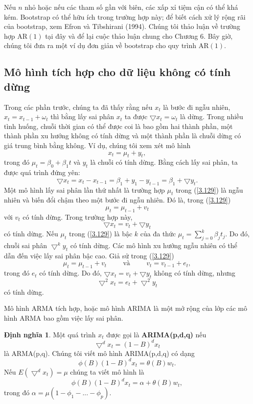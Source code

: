 \documentclass[12pt, a4paper,oneside]{book}
\theoremstyle{definition}
\newtheorem{dn}[theo]{Định nghĩa}
\begin{document}
Nếu $ n $ nhỏ hoặc nếu các tham số gần với biên, các xấp xỉ tiệm cận có thể khá kém. Bootstrap có thể hữu ích trong trường hợp này; để biết cách xử lý rộng rãi của bootstrap, xem Efron và Tibshirani (1994). Chúng tôi thảo luận về trường hợp AR$(1)$ tại đây và để lại cuộc thảo luận chung cho Chương 6. Bây giờ, chúng tôi đưa ra một ví dụ đơn giản về bootstrap cho quy trình AR$(1)$.
\subsection{Mô hình tích hợp cho dữ liệu không có tính dừng}
Trong các phần trước, chúng ta đã thấy rằng nếu $ x_{t} $ là bước đi ngẫu nhiên, $ x_{t}=x_{t-1}+\omega_{t} $ thì bằng lấy sai phân $ x_{t} $ ta được $ \bigtriangledown x_{t}=\omega_{t} $ là dừng. Trong nhiều tình huống, chuỗi thời gian có thể được coi là bao gồm hai thành phần, một thành phần xu hướng không có tính dừng và một thành phần là chuỗi dừng có giá trung bình bằng không. Ví dụ, chúng tôi xem xét mô hình
\begin{equation}
	x_t=\mu_t+y_t, \label{3.129}
\end{equation}
trong đó $\mu_t=\beta_0+\beta_1t$ và $y_t$ là chuỗi có tính dừng. Bằng cách lấy sai phân, ta được quá trình đứng yên:
$$\bigtriangledown x_t=x_t-x_{t-1}=\beta_1+y_1-y_{t-1}=\beta_1+\bigtriangledown y_t.$$
Một mô hình lấy sai phân lần thứ nhất là trường hợp $\mu_t$ trong (\ref{3.129}) là ngẫu nhiên và biến đổi chậm theo một bước đi ngẫu nhiên. Đó là, trong (\ref{3.129}) 
$$\mu_t=\mu_{t-1}+v_t$$
với $v_t$ có tính dừng. Trong trường hợp này,
$$\bigtriangledown x_t=v_t+\bigtriangledown y_t$$ có tính dừng. Nếu $\mu_t$ trong (\ref{3.129}) là bậc $k$ của đa thức $\mu_t=\sum_{j=0}^{k}\beta_jt_j$. Do đó, chuỗi sai phân $\bigtriangledown^{k}y_t$ có tính dừng. Các mô hình xu hướng ngẫu nhiên có thể dẫn đến việc lấy sai phân bậc cao. Giả sử trong (\ref{3.129}) 
$$\mu_t=\mu_{t-1}+v_t \hspace{1cm} \text{và} \hspace{1cm} v_t=v_{t-1}+e_t,$$
trong đó $e_t$ có tính dừng. Do đó, $\bigtriangledown x_t=v_t+\bigtriangledown y_t$ không có tính dừng, nhưng $$\bigtriangledown^{2}x_t=e_t+\bigtriangledown^{2}y_t$$ có tính dừng.

Mô hình ARMA tích hợp, hoặc mô hình ARIMA là một mở rộng của lớp các mô hình ARMA bao gồm việc lấy sai phân.
\begin{dn}
Một quá trình $ x_{t} $ được gọi là \textbf{ARIMA(p,d,q)} nếu 
$$\bigtriangledown^{d} x_{t}=(1-B)^{d}x_{t}$$
là ARMA(p,q). Chúng tôi viết mô hình ARIMA(p,d,q) có dạng
\begin{equation}
	\phi(B)(1-B)^{d}x_{t}=\theta(B)w_{t}. \label{ct1.185}
\end{equation} 
Nếu $ E(\bigtriangledown^{d} x_{t})=\mu $ chúng ta viết mô hình là
$$\phi(B)(1-B)^{d}x_{t}=\alpha+\theta(B)w_{t},$$
trong đó $ \alpha=\mu(1-\phi_{1}-...-\phi_{p}).$
\end{dn}
\end{document}
